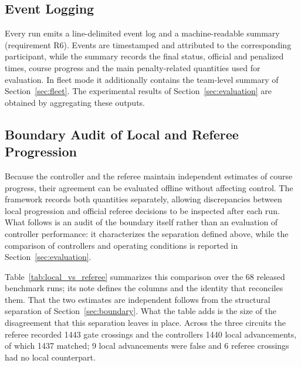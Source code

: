 \subsection{Event Logging}

Every run emits a line-delimited event log and a machine-readable summary
(requirement R6). Events are timestamped and attributed to the corresponding
participant, while the summary records the final status, official and penalized
times, course progress and the main penalty-related quantities used for
evaluation. In fleet mode it additionally contains the team-level summary of
Section~\ref{sec:fleet}. The experimental results of
Section~\ref{sec:evaluation} are obtained by aggregating these outputs.

\subsection{Boundary Audit of Local and Referee Progression}
\label{sec:eval_boundary}

Because the controller and the referee maintain independent estimates of course
progress, their agreement can be evaluated offline without affecting control.
The framework records both quantities separately, allowing discrepancies between
local progression and official referee decisions to be inspected after each run.
What follows is an audit of the boundary itself rather than an evaluation of
controller performance: it characterizes the separation defined above, while the
comparison of controllers and operating conditions is reported in
Section~\ref{sec:evaluation}.

Table~\ref{tab:local_vs_referee} summarizes this comparison over the $68$
released benchmark runs; its note defines the columns and the identity that
reconciles them. That the two estimates are independent follows from the
structural separation of Section~\ref{sec:boundary}. What the table adds is the
size of the disagreement that this separation leaves in place. Across the three
circuits the referee recorded 1443 gate crossings and the controllers 1440 local
advancements, of which 1437 matched; 9 local advancements were false and 6
referee crossings had no local counterpart.



